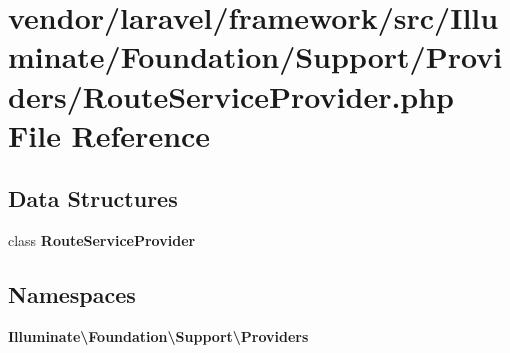 \section{vendor/laravel/framework/src/\+Illuminate/\+Foundation/\+Support/\+Providers/\+Route\+Service\+Provider.php File Reference}
\label{vendor_2laravel_2framework_2src_2_illuminate_2_foundation_2_support_2_providers_2_route_service_provider_8php}
\subsection*{Data Structures}
\begin{DoxyCompactItemize}
\item 
class {\bf Route\+Service\+Provider}
\end{DoxyCompactItemize}
\subsection*{Namespaces}
\begin{DoxyCompactItemize}
\item 
 {\bf Illuminate\textbackslash{}\+Foundation\textbackslash{}\+Support\textbackslash{}\+Providers}
\end{DoxyCompactItemize}
